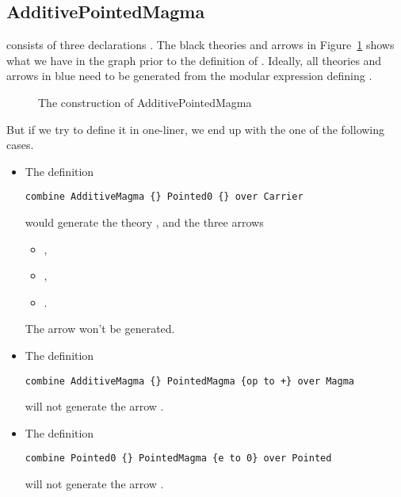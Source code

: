 \subsection{AdditivePointedMagma}
 consists of three declarations . 
The black theories and arrows in Figure~\ref{fig:addPointedMagma} shows what we  have in the graph prior to the definition of . Ideally, all theories and arrows in blue need to be generated from the modular expression defining . 
\begin{figure}[h]
    \caption{The construction of AdditivePointedMagma}
    \label{fig:addPointedMagma}
\end{figure}
But if we try to define it in one-liner, we end up with the one of the following cases. 
\begin{itemize}
 \item The definition 
\begin{lstlisting}
combine AdditiveMagma {} Pointed0 {} over Carrier
\end{lstlisting}
would generate the theory , and the three arrows 
\begin{itemize}
    \item {}, 
    \item {}, 
    \item {}. 
\end{itemize}
The arrow  won't be generated. 

\item The definition 
\begin{lstlisting}
combine AdditiveMagma {} PointedMagma {op to +} over Magma 
\end{lstlisting}
will not generate the arrow . 

\item The definition 
\begin{lstlisting}
combine Pointed0 {} PointedMagma {e to 0} over Pointed 
\end{lstlisting}
will not generate the arrow . 
\end{itemize}
